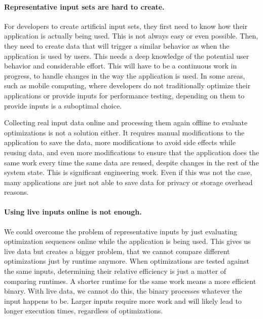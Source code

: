     \paragraph{Representative input sets are hard to create.} For developers to create artificial input sets, they first need to know how
    their application is actually being used. This is not always easy or even possible. Then, they need to create data that will trigger a
    similar behavior as when the application is used by users. This needs a deep knowledge of the potential user behavior and
    considerable effort. This will have to be a continuous work in progress, to handle changes in the way the application is used. In some
    areas, such as mobile computing, where developers do not traditionally optimize their applications or provide inputs for performance
    testing, depending on them to provide inputs is a suboptimal choice.

    Collecting real input data online and processing them again offline to evaluate optimizations is not a solution either. It requires
    manual modifications to the application to save the data, more modifications to avoid side effects while reusing data, and even more
    modifications to ensure that the application does the same work every time the same data are reused, despite changes in the rest of
    the system state. 
    This is significant engineering work. Even if this was not the case, many applications are just not able to save
    data for privacy or storage overhead reasons. 

    \paragraph{Using live inputs online is not enough.} We could overcome the problem of representative inputs by just evaluating
    optimization sequences online while the application is being used. This gives us live data but creates a bigger problem, that we cannot
    compare different optimizations just by runtime anymore. When optimizations are tested against the same inputs, determining their
    relative efficiency is just a matter of comparing runtimes. A shorter runtime for the same work means a more efficient binary.
    With live data, we cannot do this, the binary processes whatever the input happens to be. Larger inputs require more work and will
    likely lead to longer execution times, regardless of optimizations.

